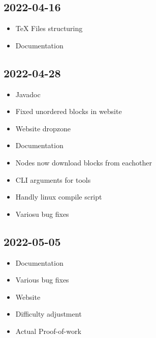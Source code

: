 \documentclass{article}
\begin{document}
\subsection*{2022-04-16}

\begin{itemize}
    \item TeX Files structuring
    \item Documentation
\end{itemize}

\subsection*{2022-04-28}

\begin{itemize}
    \item Javadoc
    \item Fixed unordered blocks in website
    \item Website dropzone
    \item Documentation
    \item Nodes now download blocks from eachother
    \item CLI arguments for tools
    \item Handly linux compile script
    \item Variosu bug fixes
\end{itemize}


\subsection*{2022-05-05}

\begin{itemize}
    \item Documentation
    \item Various bug fixes
    \item Website
    \item Difficulty adjustment
    \item Actual Proof-of-work
\end{itemize}
\end{document}
